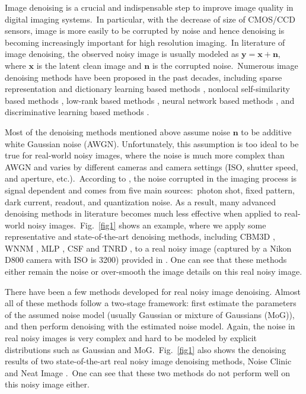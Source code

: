 \documentclass[10pt,twocolumn,letterpaper]{article}
\begin{document}
Image denoising is a crucial and indispensable step to improve image quality in digital imaging systems.\ In particular, with the decrease of size of CMOS/CCD sensors, image is more easily to be corrupted by noise and hence denoising is becoming increasingly important for high resolution imaging.\ In literature of image denoising, the observed noisy image is usually modeled as $\mathbf{y}=\mathbf{x}+\mathbf{n}$, where $\mathbf{x}$ is the latent clean image and $\mathbf{n}$ is the corrupted noise.\ Numerous image denoising methods \cite{ksvd,lssc,ncsr,nlm,bm3d,cbm3d,pgpd,wnnm,mlp,csf,chen2015learning,foe,epll} have been proposed in the past decades, including sparse representation and dictionary learning based methods \cite{ksvd,lssc,ncsr}, nonlocal self-similarity based methods \cite{ncsr,nlm,bm3d,cbm3d,pgpd}, low-rank based methods \cite{wnnm}, neural network based methods \cite{mlp}, and discriminative learning based methods \cite{csf,chen2015learning}. 

Most of the denoising methods \cite{ksvd,lssc,ncsr,nlm,bm3d,cbm3d,pgpd,wnnm,mlp,csf,chen2015learning,foe,epll} mentioned above assume noise $\mathbf{n}$ to be additive white Gaussian noise (AWGN). Unfortunately, this assumption is too ideal to be true for real-world noisy images, where the noise is much more complex than AWGN \cite{crosschannel2016,healey1994radiometric} and varies by different cameras and camera settings (ISO, shutter speed, and aperture, etc.).\ According to \cite{healey1994radiometric}, the noise corrupted in the imaging process is signal dependent and comes from five main sources:\ photon shot, fixed pattern, dark current, readout, and quantization noise. As a result, many advanced denoising methods in literature becomes much less effective when applied to real-world noisy images.\ Fig.\ \ref{fig1} shows an example, where we apply some representative and state-of-the-art denoising methods, including CBM3D \cite{cbm3d}, WNNM \cite{wnnm}, MLP \cite{mlp}, CSF \cite{csf} and TNRD \cite{chen2015learning}, to a real noisy image (captured by a Nikon D800 camera with ISO is 3200) provided in \cite{crosschannel2016}. One can see that these methods either remain the noise or over-smooth the image details on this real noisy image. 

There have been a few methods \cite{crosschannel2016,Liu2008,almapg,Zhu_2016_CVPR,noiseclinic,ncwebsite,neatimage} developed for real noisy image denoising. Almost all of these methods follow a two-stage framework: first estimate the parameters of the assumed noise model (usually Gaussian  or mixture of Gaussians (MoG)), and then perform denoising with the estimated noise model. Again, the noise in real noisy images is very complex and hard to be modeled by explicit distributions such as Gaussian and MoG.\ Fig.\ \ref{fig1} also shows the denoising results of two state-of-the-art real noisy image denoising methods, Noise Clinic \cite{noiseclinic,ncwebsite} and Neat Image \cite{neatimage}.\ One can see that these two methods do not perform well on this noisy image either. 
\end{document}
